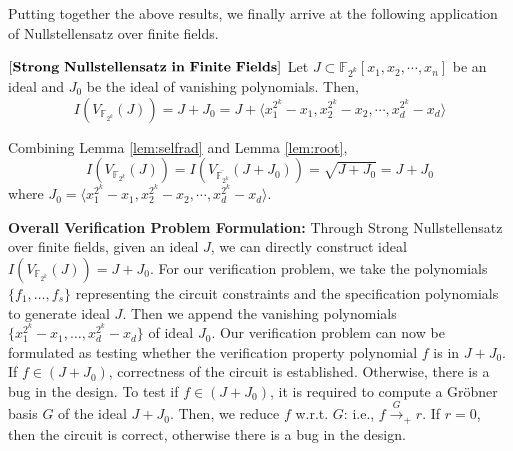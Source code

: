 Putting together the above results, we finally arrive at the following
application of Nullstellensatz over finite fields.

\begin{Theorem}\label{thm:snff}
$\left[\bf{Strong\  Nullstellensatz\ in\ Finite\ Fields}\right]$ Let
$J \subset \mathbb{F}_{2^k}[x_1, x_2, \cdots, x_n]$ be an ideal and
$J_0$ be the ideal of vanishing polynomials. Then, 
\begin{equation}
I(V_{\mathbb{F}_{2^k}}(J))=J+J_0=J+\langle x_1^{2^k}-x_1,x_2^{2^k}-x_2,\cdots, x_d^{2^k}-x_d\rangle
\end{equation}
\end{Theorem} 

\begin{Proof}
Combining Lemma \ref{lem:selfrad} and Lemma \ref{lem:root}, 
\begin{equation}
I(V_{\mathbb{F}_{2^k}}(J))=I(V_{\overline {\mathbb{F}_{2^k}}}(J+J_0))=\sqrt {J+J_0}=J+J_0
\end{equation}
where $J_0=\langle x_1^{2^k}-x_1,x_2^{2^k}-x_2,\cdots, x_d^{2^k}-x_d\rangle$.
\end{Proof}

{\bf Overall Verification Problem Formulation:} Through Strong
Nullstellensatz over finite fields, given an ideal $J$, we can
directly construct ideal $I(V_{\mathbb{F}_{2^k}}(J))=J+J_0$.  For our
verification problem, we take the polynomials $\{f_1, \dots, f_s\}$
representing the circuit constraints and the specification polynomials
to generate ideal $J$. Then we append the vanishing polynomials
$\{x_1^{2^k} - x_1, \dots, x_d^{2^k} - x_d\}$ of ideal $J_0$. Our
verification problem can now be formulated as testing whether the
verification property polynomial $f$ is in $J+J_0$. If $f \in (J +
J_0)$, correctness of the circuit is established. Otherwise, there is
a bug in the design. To test if $f \in (J + J_0)$, it is required to
compute a Gr\"obner  basis $G$ of the ideal $J+J_0$.  Then, we reduce
$f$ w.r.t. $G$: i.e., $f \stackrel{G}{\textstyle\longrightarrow}_+
r$. If $r=0$, then the circuit is correct, otherwise there is a bug in
the design.  



